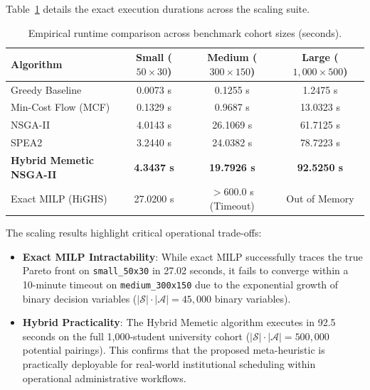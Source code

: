 Table~\ref{tab:scalability_runtimes} details the exact execution durations across the scaling suite.

\begin{table}[htbp]
    \centering
    \caption{Empirical runtime comparison across benchmark cohort sizes (seconds).}
    \label{tab:scalability_runtimes}
    \begin{tabularx}{\textwidth}{lccc}
        \toprule
        \textbf{Algorithm} & \textbf{Small ($50 \times 30$)} & \textbf{Medium ($300 \times 150$)} & \textbf{Large ($1,000 \times 500$)} \\
        \midrule
        Greedy Baseline & 0.0073 s & 0.1255 s & 1.2475 s \\
        Min-Cost Flow (MCF) & 0.1329 s & 0.9687 s & 13.0323 s \\
        NSGA-II & 4.0143 s & 26.1069 s & 61.7125 s \\
        SPEA2 & 3.2440 s & 24.0382 s & 78.7223 s \\
        \textbf{Hybrid Memetic NSGA-II} & \textbf{4.3437 s} & \textbf{19.7926 s} & \textbf{92.5250 s} \\
        Exact MILP (HiGHS) & 27.0200 s & $> 600.0$ s (Timeout) & Out of Memory \\
        \bottomrule
    \end{tabularx}
\end{table}

The scaling results highlight critical operational trade-offs:
\begin{itemize}
    \item \textbf{Exact MILP Intractability}: While exact MILP successfully traces the true Pareto front on \texttt{small\_50x30} in 27.02 seconds, it fails to converge within a 10-minute timeout on \texttt{medium\_300x150} due to the exponential growth of binary decision variables ($|\mathcal{S}| \cdot |\mathcal{A}| = 45,000$ binary variables).
    \item \textbf{Hybrid Practicality}: The Hybrid Memetic algorithm executes in 92.5 seconds on the full 1,000-student university cohort ($|\mathcal{S}| \cdot |\mathcal{A}| = 500,000$ potential pairings). This confirms that the proposed meta-heuristic is practically deployable for real-world institutional scheduling within operational administrative workflows.
\end{itemize}

